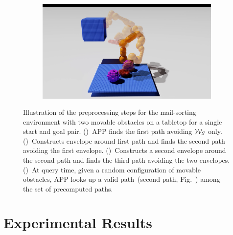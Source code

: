 \documentclass[a4paper]{report}
\begin{document}
\begin{figure}[t]
\begin{subfigure}{0.48\textwidth}
        \caption{}
        \label{fig:pr3}
    \end{subfigure}
    \begin{subfigure}{0.48\textwidth}
        \includegraphics[trim={8cm 0 10cm 1cm},clip, width=\textwidth]{path4.png}
        \caption{}
        \label{fig:prq}
    \end{subfigure}
    \caption{
    Illustration of the preprocessing steps for the mail-sorting environment with two movable obstacles on a tabletop for a single start and goal pair.
     ()~APP finds the first path avoiding $\mathcal{W}_S$ only.
    ()~Constructs envelope around first path and finds the second path avoiding the first envelope.
    ()~Constructs a second envelope around the second path and finds the third path avoiding the two envelopes.
    ()~At query time, given a random configuration of movable obstacles, APP looks up a valid path~(second path, Fig.~) among the set of precomputed paths.
    }
    \label{fig:pr}
\end{figure}

\section{Experimental Results}
\end{document}

